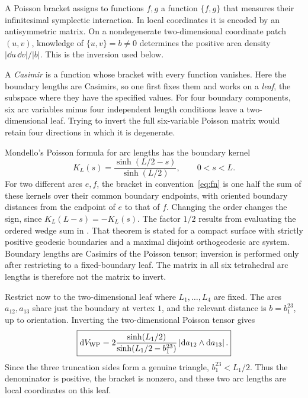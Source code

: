 A Poisson bracket assigns to functions $f,g$ a function $\{f,g\}$
that measures their infinitesimal symplectic interaction. In local
coordinates it is encoded by an antisymmetric matrix. On a
nondegenerate two-dimensional coordinate patch $(u,v)$, knowledge
of $\{u,v\}=b\ne0$ determines the positive area density
$|\dd u\,\dd v|/|b|$. This is the inversion used below.

A \emph{Casimir} is a function whose bracket with every function
vanishes. Here the boundary lengths are Casimirs, so one first fixes
them and works on a \emph{leaf}, the subspace where they have the
specified values. For four boundary components, six arc variables
minus four independent length conditions leave a two-dimensional
leaf. Trying to invert the full six-variable Poisson matrix would
retain four directions in which it is degenerate.

Mondello's Poisson formula for arc lengths has the boundary kernel
\begin{equation}
 K_L(s)=\frac{\sinh(L/2-s)}{\sinh(L/2)},\qquad 0<s<L.
 \label{eq:boundarykernel}
\end{equation}
For two different arcs $e,f$, the bracket in convention~\eqref{eq:fn} is
one half the sum of these kernels over their common boundary endpoints,
with oriented boundary distances from the endpoint of $e$ to that of $f$.
Changing the order changes the sign, since $K_L(L-s)=-K_L(s)$.
The factor $1/2$ results from evaluating the ordered wedge sum in
\cite[Theorem 4.1]{MondelloBoundary}.
That theorem is stated for a compact surface with strictly positive
geodesic boundaries and a maximal disjoint orthogeodesic arc system.
Boundary lengths are Casimirs of the Poisson tensor; inversion is performed
only after restricting to a fixed-boundary leaf. The matrix in all six
tetrahedral arc lengths is therefore not the matrix to invert.

Restrict now to the two-dimensional leaf where $L_1,\ldots,L_4$ are fixed.
The arcs $a_{12},a_{13}$ share just the boundary at vertex $1$, and the
relevant distance is $b=b_1^{23}$, up to orientation. Inverting the
two-dimensional Poisson tensor gives
\begin{equation}
 \boxed{
 \mathop{}\!\mathrm d V_{\mathrm{WP}}=
 2\frac{\sinh(L_1/2)}{\sinh(L_1/2-b_1^{23})}
 \left|\mathop{}\!\mathrm d a_{12}\wedge\mathop{}\!\mathrm d a_{13}\right|.}
 \label{eq:hyperidealdensity}
\end{equation}
Since the three truncation sides form a genuine triangle,
$b_1^{23}<L_1/2$. Thus the denominator is positive, the bracket is nonzero,
and these two arc lengths are local coordinates on this leaf.

